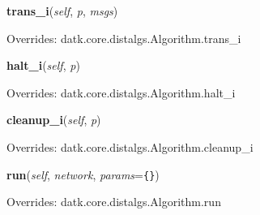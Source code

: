     \vspace{0.5ex}

\hspace{.8\funcindent}\begin{boxedminipage}{\funcwidth}

    \raggedright \textbf{trans\_i}(\textit{self}, \textit{p}, \textit{msgs})

\setlength{\parskip}{2ex}
\setlength{\parskip}{1ex}
      Overrides: datk.core.distalgs.Algorithm.trans\_i

    \end{boxedminipage}

    \vspace{0.5ex}

\hspace{.8\funcindent}\begin{boxedminipage}{\funcwidth}

    \raggedright \textbf{halt\_i}(\textit{self}, \textit{p})

\setlength{\parskip}{2ex}
\setlength{\parskip}{1ex}
      Overrides: datk.core.distalgs.Algorithm.halt\_i

    \end{boxedminipage}

    \vspace{0.5ex}

\hspace{.8\funcindent}\begin{boxedminipage}{\funcwidth}

    \raggedright \textbf{cleanup\_i}(\textit{self}, \textit{p})

\setlength{\parskip}{2ex}
\setlength{\parskip}{1ex}
      Overrides: datk.core.distalgs.Algorithm.cleanup\_i

    \end{boxedminipage}

    \vspace{0.5ex}

\hspace{.8\funcindent}\begin{boxedminipage}{\funcwidth}

    \raggedright \textbf{run}(\textit{self}, \textit{network}, \textit{params}={\tt \texttt{\{}\texttt{\}}})

\setlength{\parskip}{2ex}
\setlength{\parskip}{1ex}
      Overrides: datk.core.distalgs.Algorithm.run

    \end{boxedminipage}

    \label{datk:core:distalgs:Compose:__repr__}

